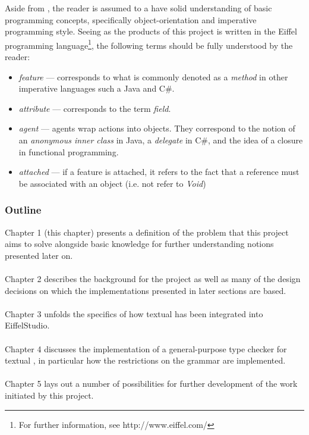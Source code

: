 Aside from \bon{}, the reader is assumed to a have solid understanding of basic programming concepts, specifically object-orientation and imperative programming style. Seeing as the products of this project is written in the Eiffel programming language\footnote{For further information, see http://www.eiffel.com/}, the following terms should be fully understood by the reader:
\begin{itemize}
\item \textit{feature} --- corresponds to what is commonly denoted as a \textit{method} in other imperative languages such a Java and C\#.
\item \textit{attribute} --- corresponds to the term \textit{field}.
\item \textit{agent} --- agents wrap actions into objects. They correspond to the notion of an \textit{anonymous inner class} in Java, a \textit{delegate} in C\#, and the idea of a closure in functional programming.
\item \textit{attached} --- if a feature is attached, it refers to the fact that a reference must be associated with an object (i.e. not refer to \textit{Void})
\end{itemize} 

\subsubsection{Outline}
Chapter 1 (this chapter) presents a definition of the problem that this project aims to solve alongside basic knowledge for further understanding notions presented later on.
\paragraph{}
Chapter 2 describes the background for the project as well as many of the design decisions on which the implementations presented in later sections are based.
\paragraph{}
Chapter 3 unfolds the specifics of how textual \bon{} has been integrated into EiffelStudio.
\paragraph{}
Chapter 4 discusses the implementation of a general-purpose type checker for textual \bon{}, in particular how the restrictions on the grammar are implemented.
\paragraph{}
Chapter 5 lays out a number of possibilities for further development of the work initiated by this project.
